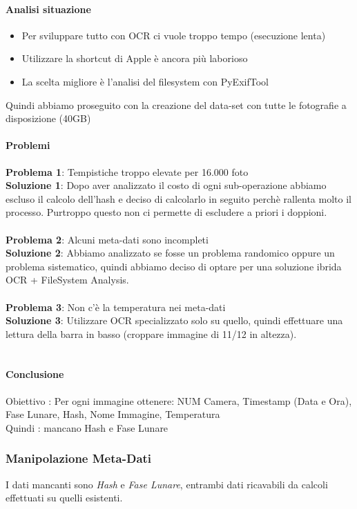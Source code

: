 \documentclass[12pt,a4paper,twoside]{article}
\begin{document}
\paragraph{Analisi situazione}
\begin{itemize}
    \item Per sviluppare tutto con OCR ci vuole troppo tempo (esecuzione lenta)
    \item Utilizzare la shortcut di Apple è ancora più laborioso
    \item La scelta migliore è l'analisi del filesystem con PyExifTool
\end{itemize}
Quindi abbiamo proseguito con la creazione del data-set con tutte le fotografie a disposizione (40GB)

\paragraph{Problemi}
\textbf{Problema 1}: Tempistiche troppo elevate per 16.000 foto\\
\textbf{Soluzione 1}: Dopo aver analizzato il costo di ogni sub-operazione abbiamo escluso il calcolo 
dell'hash e deciso di calcolarlo in seguito perchè rallenta molto il processo. Purtroppo questo non ci 
permette di escludere a priori i doppioni.\\
\\
\textbf{Problema 2}: Alcuni meta-dati sono incompleti\\
\textbf{Soluzione 2}: Abbiamo analizzato se fosse un problema randomico oppure un problema sistematico, 
quindi abbiamo deciso di optare per una soluzione ibrida OCR + FileSystem Analysis.\\
\\
\textbf{Problema 3}: Non c'è la temperatura nei meta-dati\\
\textbf{Soluzione 3}: Utilizzare OCR specializzato solo su quello, quindi effettuare una lettura della 
barra in basso (croppare immagine di 11/12 in altezza).\\
\\

\paragraph{Conclusione}
Obiettivo : Per ogni immagine ottenere: NUM Camera, Timestamp (Data e Ora), Fase Lunare, Hash, Nome
Immagine, Temperatura\\
Quindi : mancano Hash e Fase Lunare

\subsubsection{Manipolazione Meta-Dati}
I dati mancanti sono \textit{Hash} e \textit{Fase Lunare}, entrambi dati ricavabili da calcoli effettuati
su quelli esistenti.\\
\end{document}

